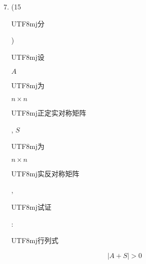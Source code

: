 \documentclass[10pt]{article}
\begin{document}
\begin{enumerate}
  \setcounter{enumi}{6}
  \item (15 \begin{CJK}{UTF8}{mj}分\end{CJK}) \begin{CJK}{UTF8}{mj}设\end{CJK} $A$ \begin{CJK}{UTF8}{mj}为\end{CJK} $n \times n$ \begin{CJK}{UTF8}{mj}正定实对称矩阵\end{CJK}, $S$ \begin{CJK}{UTF8}{mj}为\end{CJK} $n \times n$ \begin{CJK}{UTF8}{mj}实反对称矩阵\end{CJK}, \begin{CJK}{UTF8}{mj}试证\end{CJK}: \begin{CJK}{UTF8}{mj}行列式\end{CJK}
\end{enumerate}
$$
|A+S|>0
$$
\end{document}
